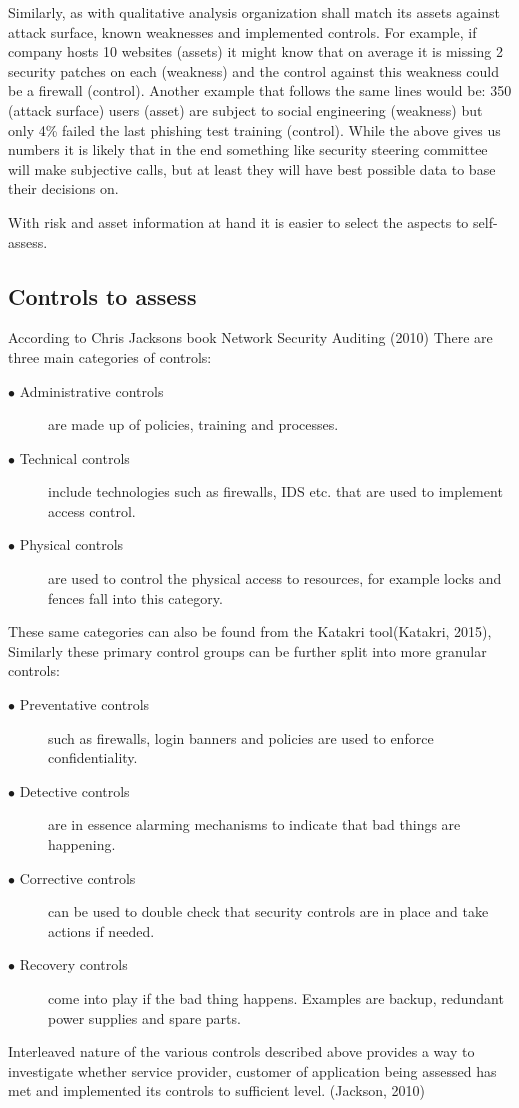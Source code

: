 \documentclass{article}
\begin{document}
Similarly, as with qualitative analysis organization shall match its assets against attack surface, known weaknesses and implemented controls. For example, if company hosts 10 websites (assets) it might know that on average it is missing 2 security patches on each (weakness) and the control against this weakness could be a firewall (control). Another example that follows the same lines would be: 350 (attack surface) users (asset) are subject to social engineering (weakness) but only 4\% failed the last phishing test training (control).
While the above gives us numbers it is likely that in the end something like security steering committee will make subjective calls, but at least they will have best possible data to base their decisions on.
\par
With risk and asset information at hand it is easier to select the aspects to self-assess. 
\subsection{Controls to assess}
According to Chris Jacksons book Network Security Auditing (2010) There are three main categories of controls:
\begin{description}
	\item[$\bullet$ Administrative controls] are made up of policies, training and processes.
	\item[$\bullet$ Technical controls] include technologies such as firewalls, IDS etc. that are used to implement access control.
	\item[$\bullet$ Physical controls] are used to control the physical access to resources, for example locks and fences fall into this category.
\end{description}
These same categories can also be found from the Katakri tool(Katakri, 2015), Similarly these primary control groups can be further split into more granular controls:
\begin{description}
	\item[$\bullet$ Preventative controls] such as firewalls, login banners and policies are used to enforce confidentiality.
	\item[$\bullet$ Detective controls] are in essence alarming mechanisms to indicate that bad things are happening.
	\item[$\bullet$ Corrective controls] can be used to double check that security controls are in place and take actions if needed.
	\item[$\bullet$ Recovery controls] come into play if the bad thing happens. Examples are backup, redundant power supplies and spare parts.
\end{description}
Interleaved nature of the various controls described above provides a way to investigate whether service provider, customer of application being assessed has met and implemented its controls to sufficient level. (Jackson, 2010)
\end{document}
